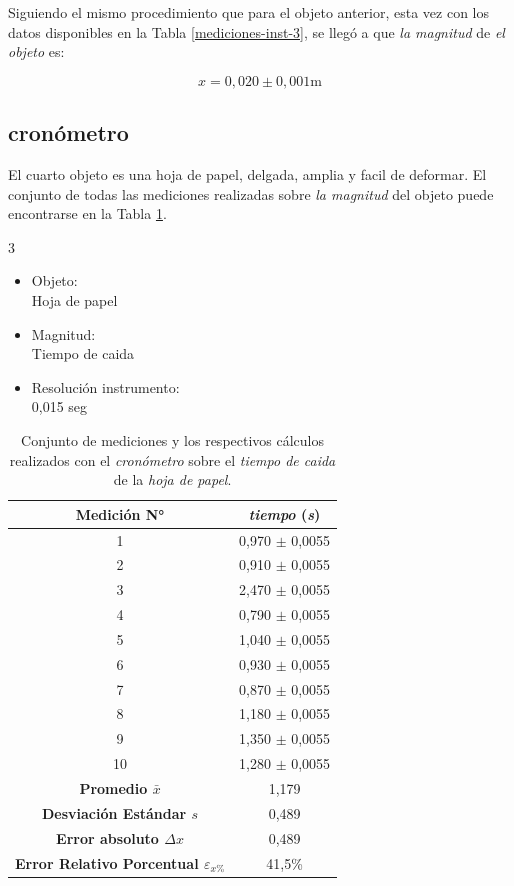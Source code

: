 \documentclass[12pt,a4paper]{article}
\begin{document}
Siguiendo el mismo procedimiento que para el objeto anterior, esta vez con los datos disponibles en la Tabla \ref{mediciones-inst-3}, se llegó a que \textit{la magnitud} de \textit{el objeto} es:

\begin{equation*}
x = 0,020 \pm 0,001\textrm{m}
\end{equation*}

\subsection{cronómetro}

El cuarto objeto es una hoja de papel, delgada, amplia y facil de deformar. El conjunto de todas las mediciones realizadas sobre \textit{la magnitud} del objeto puede encontrarse en la Tabla \ref{mediciones-inst-4}.

\begin{multicols}{3}
\begin{itemize}

    \item Objeto: \\ Hoja de papel
    \item Magnitud: \\ Tiempo de caida
    \item Resolución instrumento: \\ 0,015 seg
\end{itemize}
\end{multicols}

\begin{table}[h!]
\centering
\begin{tabular}{|c|c|}
\hline
\textbf{Medición N°} & \textit{tiempo} \textbf{(}\textit{s}\textbf{)} \\ \hline
1 & 0,970 $\pm$ 0,0055 \\ \hline
2 & 0,910 $\pm$ 0,0055 \\ \hline
3 & 2,470 $\pm$ 0,0055 \\ \hline
4 & 0,790 $\pm$ 0,0055 \\ \hline
5 & 1,040 $\pm$ 0,0055 \\ \hline
6 & 0,930 $\pm$ 0,0055 \\ \hline
7 & 0,870 $\pm$ 0,0055 \\ \hline
8 & 1,180 $\pm$ 0,0055 \\ \hline
9 & 1,350 $\pm$ 0,0055 \\ \hline
10 & 1,280 $\pm$ 0,0055 \\ \hline
\textbf{Promedio $\bar{x}$} & 1,179 \\ \hline
\textbf{Desviación Estándar $s$} & 0,489 \\ \hline
\textbf{Error absoluto $\Delta x$} & 0,489 \\ \hline
\textbf{Error Relativo Porcentual $\varepsilon_{x\%}$} & 41,5\% \\ \hline
\end{tabular}
\caption{Conjunto de mediciones y los respectivos cálculos realizados con el \textit{cronómetro} sobre el \textit{tiempo de caida} de la \textit{hoja de papel}.}
\label{mediciones-inst-4}
\end{table}
\end{document}
